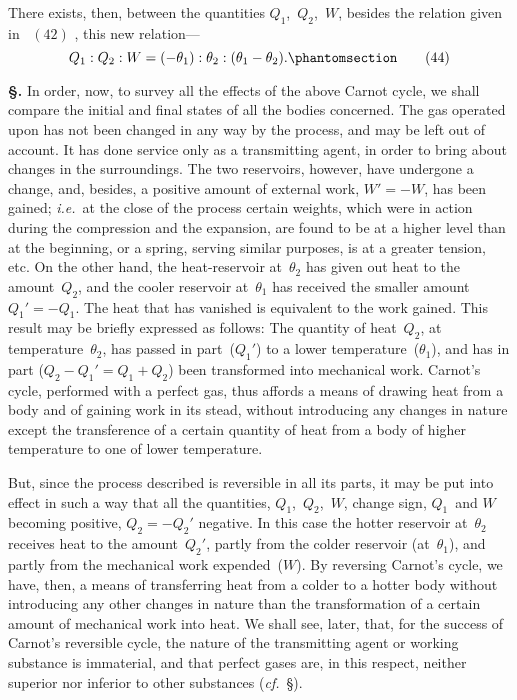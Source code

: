 \documentclass[12pt]{book}[2005/09/16]
\newcommand{\Chg}[2]{#2}
\newcommand{\Add}[1]{\Chg{}{#1}}
\newcommand{\Section}[1]{
  \medskip\par\textbf{§\;#1}
  \label{section:#1}
}
\newcommand{\SecRef}[2][§\;]{\hyperref[section:#2.]{{\upshape #1#2}}}
\newcommand{\Tag}[1]{%
  \phantomsection\label{eqn:#1}\tag*{\ensuremath{#1}}%
}
\newcommand{\Eq}[1]{%
  \hyperref[eqn:#1]{\ensuremath{#1}}%
}
\newcommand{\PageSep}[1]{\ignorespaces}
\newcommand{\ie}{\emph{i.e.}}
\renewcommand{\cf}{\emph{cf.}}
\begin{document}
There exists, then, between the quantities $Q_{1}$,~$Q_{2}$,~$W$,
besides the relation given in~\Eq{(42)}, this new relation---
\[
Q_{1} : Q_{2}: W = (-\theta_{1}): \theta_{2} : (\theta_{1} - \theta_{2})\Add{.}
\Tag{(44)}
\]

\Section{91.} In order, now, to survey all the effects of the
above Carnot cycle, we shall compare the initial and final
states of all the bodies concerned. The gas operated upon
has not been changed in any way by the process, and may
be left out of account. It has done service only as a transmitting
agent, in order to bring about changes in the
surroundings. The two reservoirs, however, have undergone
a change, and, besides, a positive amount of external work,
$W' = -W$, has been gained; \ie\ at the close of the process
certain weights, which were in action during the compression
and the expansion, are found to be at a higher level than at
the beginning, or a spring, serving similar purposes, is at a
greater tension, etc. On the other hand, the heat-reservoir
at~$\theta_{2}$ has given out heat to the amount~$Q_{2}$, and the cooler
reservoir at~$\theta_{1}$ has received the smaller amount $Q_{1}' = -Q_{1}$.
The heat that has vanished is equivalent to the work gained.
This result may be briefly expressed as follows: The
quantity of heat~$Q_{2}$, at temperature~$\theta_{2}$, has passed in part~($Q_{1}'$)
to a lower temperature~($\theta_{1}$), and has in part ($Q_{2} - Q_{1}' = Q_{1} + Q_{2}$)
been transformed into mechanical work. Carnot's
cycle, performed with a perfect gas, thus affords a means of
drawing heat from a body and of gaining work in its stead,
without introducing any changes in nature except the
\PageSep{66}
transference of a certain quantity of heat from a body of
higher temperature to one of lower temperature.

But, since the process described is reversible in all its
parts, it may be put into effect in such a way that all the
quantities, $Q_{1}$,~$Q_{2}$,~$W$, change sign, $Q_{1}$~and $W$ becoming
positive, $Q_{2} = -Q_{2}'$ negative. In this case the hotter
reservoir at~$\theta_{2}$ receives heat to the amount~$Q_{2}'$, partly from
the colder reservoir (at~$\theta_{1}$), and partly from the mechanical
work expended~($W$). By reversing Carnot's cycle, we have,
then, a means of transferring heat from a colder to a hotter
body without introducing any other changes in nature than
the transformation of a certain amount of mechanical work
into heat. We shall see, later, that, for the success of
Carnot's reversible cycle, the nature of the transmitting
agent or working substance is immaterial, and that perfect
gases are, in this respect, neither superior nor inferior to
other substances (\cf~\SecRef{137}).
\PageSep{67}
\end{document}
